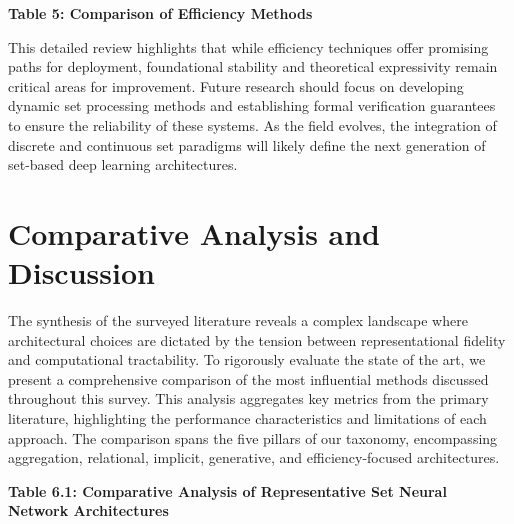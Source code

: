 \documentclass{article}
\begin{document}
\textbf{Table 5: Comparison of Efficiency Methods}

This detailed review highlights that while efficiency techniques offer promising paths for deployment, foundational stability and theoretical expressivity remain critical areas for improvement. Future research should focus on developing dynamic set processing methods and establishing formal verification guarantees to ensure the reliability of these systems. As the field evolves, the integration of discrete and continuous set paradigms will likely define the next generation of set-based deep learning architectures.

\section{Comparative Analysis and Discussion}

\label{sec:comparative_analysis_and_discussion}

The synthesis of the surveyed literature reveals a complex landscape where architectural choices are dictated by the tension between representational fidelity and computational tractability. To rigorously evaluate the state of the art, we present a comprehensive comparison of the most influential methods discussed throughout this survey. This analysis aggregates key metrics from the primary literature, highlighting the performance characteristics and limitations of each approach. The comparison spans the five pillars of our taxonomy, encompassing aggregation, relational, implicit, generative, and efficiency-focused architectures.

\textbf{Table 6.1: Comparative Analysis of Representative Set Neural Network Architectures}
\end{document}
